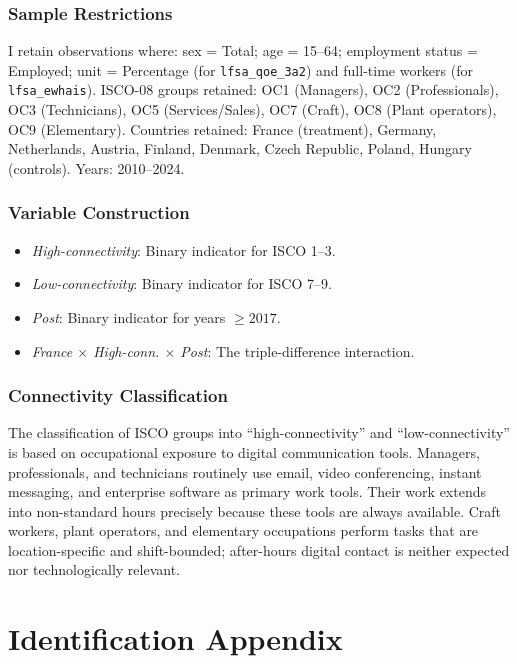 \documentclass[12pt]{article}
\begin{document}
\subsubsection*{Sample Restrictions} I retain observations where: sex = Total; age = 15--64; employment status = Employed; unit = Percentage (for \texttt{lfsa\_qoe\_3a2}) and full-time workers (for \texttt{lfsa\_ewhais}). ISCO-08 groups retained: OC1 (Managers), OC2 (Professionals), OC3 (Technicians), OC5 (Services/Sales), OC7 (Craft), OC8 (Plant operators), OC9 (Elementary). Countries retained: France (treatment), Germany, Netherlands, Austria, Finland, Denmark, Czech Republic, Poland, Hungary (controls). Years: 2010--2024.

\subsubsection*{Variable Construction}
\begin{itemize}
\item \textit{High-connectivity}: Binary indicator for ISCO 1--3.
\item \textit{Low-connectivity}: Binary indicator for ISCO 7--9.
\item \textit{Post}: Binary indicator for years $\geq 2017$.
\item \textit{France $\times$ High-conn. $\times$ Post}: The triple-difference interaction.
\end{itemize}

\subsubsection*{Connectivity Classification} The classification of ISCO groups into ``high-connectivity'' and ``low-connectivity'' is based on occupational exposure to digital communication tools. Managers, professionals, and technicians routinely use email, video conferencing, instant messaging, and enterprise software as primary work tools. Their work extends into non-standard hours precisely because these tools are always available. Craft workers, plant operators, and elementary occupations perform tasks that are location-specific and shift-bounded; after-hours digital contact is neither expected nor technologically relevant.


\section{Identification Appendix}
\label{sec:id_appendix}
\end{document}
